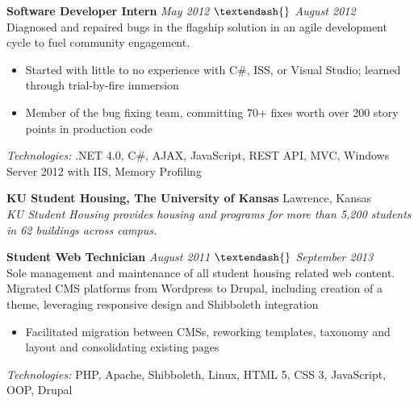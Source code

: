 \documentclass[10pt]{article}
\begin{document}
\begin{addmargin}[1em]{0em}
  \textbf{Software Developer Intern} \hfill \textit{May 2012 $\textendash{}$ August 2012} \\
  Diagnosed and repaired bugs in the flagship solution in an agile development cycle to fuel community engagement. \\
  \vspace{-1em}
  \begin{itemize}
    \item Started with little to no experience with C\#, ISS, or Visual Studio; learned through trial-by-fire immersion
    \item Member of the bug fixing team, committing 70+ fixes worth over 200 story points in production code
  \end{itemize}
  \textit{Technologies:} .NET 4.0, C\#, AJAX, JavaScript, REST API, MVC, Windows Server 2012 with IIS, Memory Profiling
\end{addmargin}
\textbf{KU Student Housing, The University of Kansas} \hfill Lawrence, Kansas \\
\textit{KU Student Housing provides housing and programs for more than 5,200 students in 62 buildings across campus.} \\
\begin{addmargin}[1em]{0em}
  \textbf{Student Web Technician} \hfill \textit{August 2011 $\textendash{}$ September 2013} \\
  Sole management and maintenance of all student housing related web content. Migrated CMS platforms from Wordpress to Drupal, including creation of a theme, leveraging responsive design and Shibboleth integration \\
  \vspace{-1em}
  \begin{itemize}
    \item Facilitated migration between CMSs, reworking templates, taxonomy and layout and consolidating existing pages
  \end{itemize}
  \textit{Technologies:} PHP, Apache, Shibboleth, Linux, HTML 5, CSS 3, JavaScript, OOP, Drupal
\end{addmargin}
\end{document}
